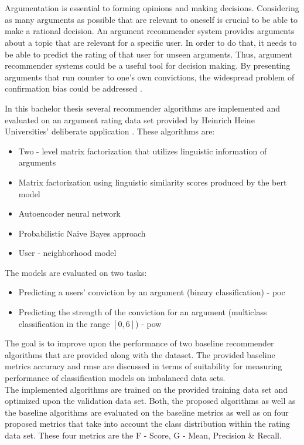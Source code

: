 \section*{}

Argumentation is essential to forming opinions and making decisions. Considering as many arguments as possible that are relevant to oneself is crucial to be able to make a rational decision. An argument recommender system provides arguments about a topic that are relevant for a specific user. In order to do that, it needs to be able to predict the rating of that user for unseen arguments. Thus, argument recommender systems could be a useful tool for decision making. By presenting arguments that run counter to one's own convictions, the widespread problem of confirmation bias could be addressed \cite{nickerson1998confirmation}. 

In this bachelor thesis several recommender algorithms are implemented and evaluated on an argument rating data set provided by Heinrich Heine Universities' deliberate application \cite{HowIArgue}. These algorithms are:
\begin{itemize}
    \item Two - level matrix factorization that utilizes linguistic information of arguments
    \item Matrix factorization using linguistic similarity scores produced by the \acrfull{bert} model
    \item Autoencoder neural network
    \item Probabilistic Naive Bayes approach
    \item User - neighborhood model
\end{itemize}
The models are evaluated on two tasks:
\begin{itemize}
    \item Predicting a users' conviction by an argument (binary classification) - \acrfull{poc}
    \item Predicting the strength of the conviction for an argument (multiclass classification in the range $[0,6]$) - \acrfull{pow}
\end{itemize}

The goal is to improve upon the performance of two baseline recommender algorithms that are provided along with the dataset.
The provided baseline metrics accuracy and rmse are discussed in terms of suitability for measuring performance of classification models on imbalanced data sets.\\
The implemented algorithms are trained on the provided training data set and optimized upon the validation data set. Both, the proposed algorithms as well as the baseline algorithms are evaluated on the baseline metrics as well as on four proposed metrics that take into account the class distribution within the rating data set. These four metrics are the F - Score, G - Mean, Precision \& Recall. 

